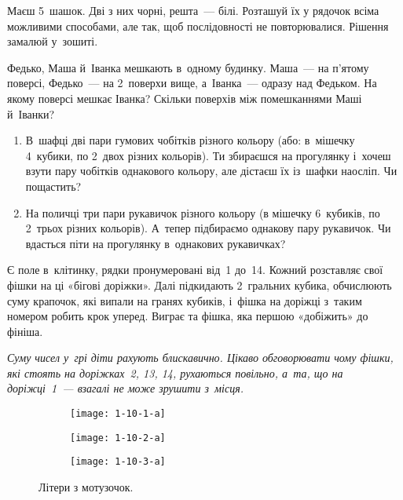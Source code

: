 \problem
Маєш 5~шашок. Дві з них чорні, решта~--- білі.
Розташуй їх у рядочок всіма можливими способами, але так,
щоб послідовності не повторювалися.
Рішення замалюй у~зошиті.


\problem
Федько, Маша й~Іванка мешкають в~одному будинку.
Маша~--- на п’ятому поверсі, Федько~--- на 2~поверхи вище,
а~Іванка~--- одразу над Федьком.
На якому поверсі мешкає Іванка?
Скільки поверхів між помешканнями Маші й~Іванки?


\problem
\begin{enumerate}
  \item В~шафці дві пари гумових чобітків різного кольору
  (або: в~мішечку 4~кубики, по 2~двох різних кольорів).
  Ти збираєшся на прогулянку і~хочеш взути пару чобітків однакового кольору,
  але дістаєш їх із~шафки наосліп. Чи пощастить?
  \item На поличці три пари рукавичок різного кольору
  (в мішечку 6~кубиків, по 2~трьох різних кольорів).
  А~тепер підбираємо однакову пару рукавичок.
  Чи вдасться піти на прогулянку в~однакових рукавичках?
\end{enumerate}


\problem
Є поле в~клітинку, рядки пронумеровані від~1 до~14.
Кожний розставляє свої фішки на ці «бігові доріжки».
Далі підкидають 2~гральних кубика, обчислюють суму крапочок,
які випали на гранях кубиків, і~фішка на доріжці з~таким номером
робить крок уперед.
Виграє та фішка, яка першою «добіжить» до фініша.

\emph{%
Суму чисел у~грі діти рахують блискавично.
Цікаво обговорювати чому фішки, які стоять на доріжках~2, 13, 14, рухаються повільно,
а~та, що на доріжці~1~--- взагалі не може зрушити з~місця.
}


\problem
{}

\begin{figure}[ht]
  \centering
  \quad \quad
  \begin{subfigure}{0.3\textwidth}
    \texttt{[image: 1-10-1-a]}
  \end{subfigure}
  \begin{subfigure}{0.3\textwidth}
    \texttt{[image: 1-10-2-a]}
  \end{subfigure}
  \begin{subfigure}{0.3\textwidth}
    \texttt{[image: 1-10-3-a]}
  \end{subfigure}
  \caption{Літери з мотузочок.}
  \label{fig:rope-letters}
\end{figure}

